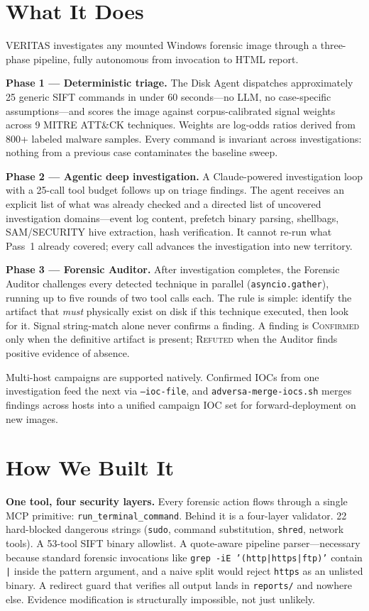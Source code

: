 \documentclass[10pt, letterpaper]{article}
\begin{document}
\section{What It Does}

VERITAS investigates any mounted Windows forensic image through a
three-phase pipeline, fully autonomous from invocation to HTML report.

\textbf{Phase 1 — Deterministic triage.} The Disk Agent dispatches
approximately 25 generic SIFT commands in under 60 seconds---no LLM,
no case-specific assumptions---and scores the image against
corpus-calibrated signal weights across 9 MITRE ATT\&CK techniques.
Weights are log-odds ratios derived from 800+ labeled malware samples.
Every command is invariant across investigations: nothing from a previous
case contaminates the baseline sweep.

\textbf{Phase 2 — Agentic deep investigation.} A Claude-powered
investigation loop with a 25-call tool budget follows up on triage
findings. The agent receives an explicit list of what was already
checked and a directed list of uncovered investigation domains---event
log content, prefetch binary parsing, shellbags, SAM/SECURITY hive
extraction, hash verification. It cannot re-run what Pass~1 already
covered; every call advances the investigation into new territory.

\textbf{Phase 3 — Forensic Auditor.} After investigation completes,
the Forensic Auditor challenges every detected technique in parallel
(\texttt{asyncio.gather}), running up to five rounds of two tool calls
each. The rule is simple: identify the artifact that \emph{must}
physically exist on disk if this technique executed, then look for it.
Signal string-match alone never confirms a finding. A finding is
\textsc{Confirmed} only when the definitive artifact is present;
\textsc{Refuted} when the Auditor finds positive evidence of absence.

Multi-host campaigns are supported natively. Confirmed IOCs from one
investigation feed the next via \texttt{--ioc-file}, and
\texttt{adversa-merge-iocs.sh} merges findings across hosts into a
unified campaign IOC set for forward-deployment on new images.

\section{How We Built It}

\textbf{One tool, four security layers.} Every forensic action flows
through a single MCP primitive: \texttt{run\_terminal\_command}. Behind it
is a four-layer validator. 22 hard-blocked dangerous strings (\texttt{sudo},
command substitution, \texttt{shred}, network tools). A 53-tool SIFT
binary allowlist. A quote-aware pipeline parser---necessary because
standard forensic invocations like \texttt{grep -iE '(http|https|ftp)'}
contain \texttt{|} inside the pattern argument, and a naive split would
reject \texttt{https} as an unlisted binary. A redirect guard that
verifies all output lands in \texttt{reports/} and nowhere else.
Evidence modification is structurally impossible, not just unlikely.
\end{document}
